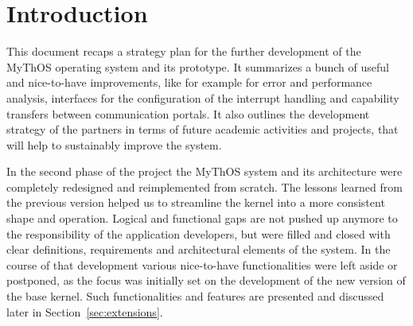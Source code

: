 % 
% 
% 

\section{Introduction}
\label{sec:intro}

This document recaps a strategy plan for the further development of the MyThOS
operating system and its prototype. It summarizes a bunch of useful and
nice-to-have improvements, like for example for error and performance analysis, interfaces
for the configuration of the interrupt handling and capability transfers
between communication portals. It also outlines the development strategy of the
partners in terms of future academic activities and projects, that will help to
sustainably improve the system.

In the second phase of the project the MyThOS system and its architecture were
completely redesigned and reimplemented from scratch. The lessons learned from
the previous version helped us to streamline the kernel into a more consistent
shape and operation. Logical and functional gaps are not pushed up anymore to
the responsibility of the application developers, but were filled and closed
with clear definitions, requirements and architectural elements of the system.
In the course of that development various nice-to-have functionalities were left
aside or postponed, as the focus was initially set on the development of the new
version of the base kernel. Such functionalities and features are presented and
discussed later in Section~\ref{sec:extensions}.

